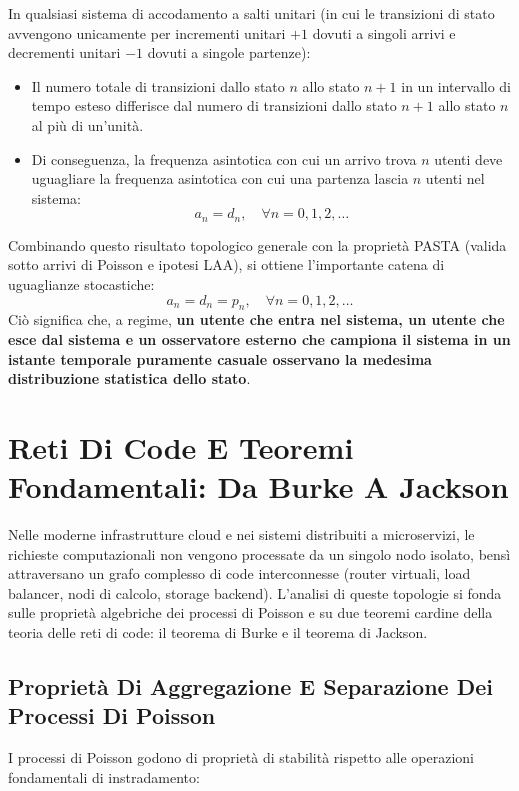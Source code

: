 \documentclass[11pt, a4paper]{article}
\begin{document}
In qualsiasi sistema di accodamento a salti unitari (in cui le transizioni di stato avvengono unicamente per incrementi unitari $+1$ dovuti a singoli arrivi e decrementi unitari $-1$ dovuti a singole partenze):
\begin{itemize}[noitemsep]
    \item Il numero totale di transizioni dallo stato $n$ allo stato $n+1$ in un intervallo di tempo esteso differisce dal numero di transizioni dallo stato $n+1$ allo stato $n$ al più di un'unità.
    \item Di conseguenza, la frequenza asintotica con cui un arrivo trova $n$ utenti deve uguagliare la frequenza asintotica con cui una partenza lascia $n$ utenti nel sistema:
    \[
    \boxed{a_n = d_n, \quad \forall n = 0, 1, 2, \dots}
    \]
\end{itemize}
Combinando questo risultato topologico generale con la proprietà PASTA (valida sotto arrivi di Poisson e ipotesi LAA), si ottiene l'importante catena di uguaglianze stocastiche:
\[
\boxed{a_n = d_n = p_n, \quad \forall n = 0, 1, 2, \dots}
\]
Ciò significa che, a regime, \textbf{un utente che entra nel sistema, un utente che esce dal sistema e un osservatore esterno che campiona il sistema in un istante temporale puramente casuale osservano la medesima distribuzione statistica dello stato}.

\newpage

\section{Reti Di Code E Teoremi Fondamentali: Da Burke A Jackson}

Nelle moderne infrastrutture cloud e nei sistemi distribuiti a microservizi, le richieste computazionali non vengono processate da un singolo nodo isolato, bensì attraversano un grafo complesso di code interconnesse (router virtuali, load balancer, nodi di calcolo, storage backend). L'analisi di queste topologie si fonda sulle proprietà algebriche dei processi di Poisson e su due teoremi cardine della teoria delle reti di code: il teorema di Burke e il teorema di Jackson.

\subsection{Proprietà Di Aggregazione E Separazione Dei Processi Di Poisson}

I processi di Poisson godono di proprietà di stabilità rispetto alle operazioni fondamentali di instradamento:
\end{document}
